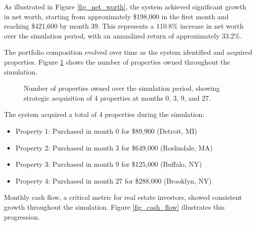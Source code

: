 \documentclass[conference]{IEEEtran}
\begin{document}
As illustrated in Figure \ref{fig_net_worth}, the system achieved significant growth in net worth, starting from approximately \$198,000 in the first month and reaching \$421,600 by month 39. This represents a 110.8\% increase in net worth over the simulation period, with an annualized return of approximately 33.2\%.

The portfolio composition evolved over time as the system identified and acquired properties. Figure \ref{fig_properties} shows the number of properties owned throughout the simulation.

\begin{figure}[htbp]
\caption{Number of properties owned over the simulation period, showing strategic acquisition of 4 properties at months 0, 3, 9, and 27.}
\label{fig_properties}
\end{figure}

The system acquired a total of 4 properties during the simulation:
\begin{itemize}
\item Property 1: Purchased in month 0 for \$89,900 (Detroit, MI)
\item Property 2: Purchased in month 3 for \$649,000 (Roslindale, MA)
\item Property 3: Purchased in month 9 for \$125,000 (Buffalo, NY)
\item Property 4: Purchased in month 27 for \$288,000 (Brooklyn, NY)
\end{itemize}

Monthly cash flow, a critical metric for real estate investors, showed consistent growth throughout the simulation. Figure \ref{fig_cash_flow} illustrates this progression.
\end{document}
